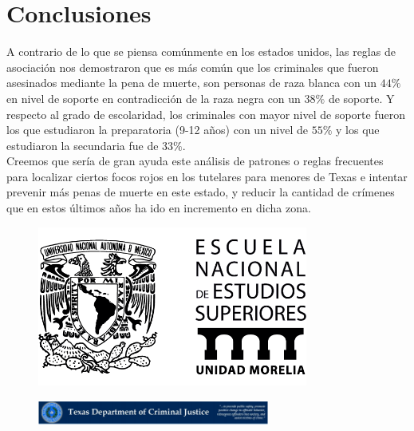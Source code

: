 \documentclass[sigconf]{acmart}
\begin{document}
\section{Conclusiones}
A contrario de lo que se piensa comúnmente en los estados unidos, las reglas de asociación nos demostraron que es más común que los criminales que fueron asesinados mediante la pena de muerte, son personas de raza blanca con un $44\%$ en nivel de soporte en contradicción de la raza negra con un $38\%$ de soporte. Y respecto al grado de escolaridad, los criminales con mayor nivel de soporte fueron los que estudiaron la preparatoria (9-12 años) con un nivel de $55\%$ y los que estudiaron la secundaria fue de $33\%$.\\ Creemos que sería de gran ayuda este análisis de patrones o reglas frecuentes para localizar ciertos focos rojos en los tutelares para menores de Texas e intentar prevenir más penas de muerte en este estado, y reducir la cantidad de crímenes que en estos últimos años ha ido en incremento en dicha zona.\\

{}

\vskip 3in
\begin{figure}[ht!]
  \centering
  \includegraphics[width=3.5in]{enes.png}
\end{figure}

\begin{figure}[ht!]
  \centering
  \includegraphics[width=3.0in]{C.PNG}
\end{figure}
\end{document}
